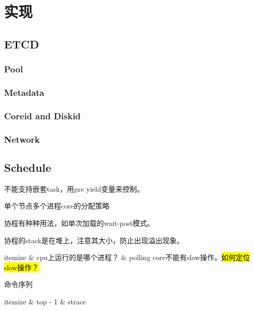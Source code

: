 \chapter{实现}

\section{ETCD}

\subsection{Pool}


\subsection{Metadata}


\subsection{Coreid and Diskid}


\subsection{Network}


\section{Schedule}


不能支持嵌套task，用pre yield变量来控制。

单个节点多个进程core的分配策略

协程有种种用法，如单次加载的wait-post模式。

协程的stack是在堆上，注意其大小，防止出现溢出现象。

\begin{myeasylist}{itemize}
& cpu上运行的是哪个进程？
& polling core不能有slow操作。\hl{如何定位slow操作？}
\end{myeasylist}

命令序列
\begin{myeasylist}{itemize}
& top - 1
& strace
\end{myeasylist}

